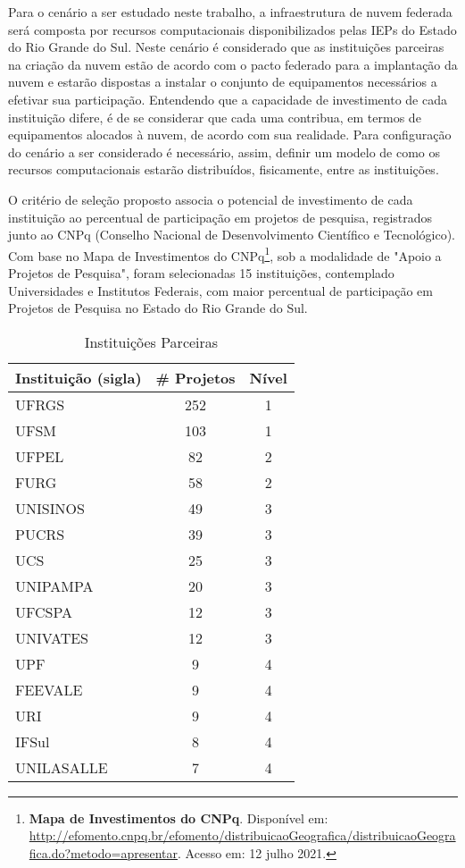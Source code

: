 \documentclass[tese,capa]{texufpel}
\begin{document}
Para o cenário a ser estudado neste trabalho, a infraestrutura de nuvem federada será composta por recursos computacionais disponibilizados pelas IEPs do Estado do Rio Grande do Sul. Neste cenário é considerado que as instituições parceiras na criação da nuvem estão de acordo com o pacto federado para a implantação da nuvem e estarão dispostas a instalar o conjunto de equipamentos necessários a efetivar sua participação. Entendendo que a capacidade de investimento de cada instituição difere, é de se considerar que cada uma contribua, em termos de equipamentos alocados à nuvem, de acordo com sua realidade. Para configuração do cenário a ser considerado é necessário, assim, definir um modelo de como os recursos computacionais estarão distribuídos, fisicamente, entre as instituições. 

O critério de seleção proposto associa o potencial de investimento de cada instituição ao percentual de participação em projetos de pesquisa, registrados junto ao CNPq (Conselho Nacional de Desenvolvimento Científico e Tecnológico). Com base no Mapa de Investimentos do CNPq\footnote{\textbf{Mapa de Investimentos do CNPq}. Disponível em: \url{http://efomento.cnpq.br/efomento/distribuicaoGeografica/distribuicaoGeografica.do?metodo=apresentar}. Acesso em: 12 julho 2021.}, sob a modalidade de "Apoio a Projetos de Pesquisa", foram selecionadas 15 instituições, contemplado Universidades e Institutos Federais, com maior percentual de participação em Projetos de Pesquisa no Estado do Rio Grande do Sul.

\begin{table}[H]
\centering
\caption{Instituições Parceiras}
\label{tab:instpar}
\begin{tabular}{@{}lcc@{}}
\toprule
\textbf{Instituição (sigla)} & \multicolumn{1}{l}{\textbf{\# Projetos}} & \multicolumn{1}{l}{\textbf{Nível}} \\ \midrule
UFRGS      & 252 & 1 \\
UFSM       & 103 & 1 \\ \midrule
UFPEL      & 82  & 2 \\
FURG       & 58  & 2 \\ \midrule
UNISINOS   & 49  & 3 \\
PUCRS      & 39  & 3 \\
UCS        & 25  & 3 \\
UNIPAMPA   & 20  & 3 \\
UFCSPA     & 12  & 3 \\
UNIVATES   & 12  & 3 \\ \midrule
UPF        & 9   & 4 \\ 
FEEVALE    & 9   & 4 \\
URI        & 9   & 4 \\
IFSul      & 8   & 4 \\
UNILASALLE & 7   & 4 \\ \bottomrule
\end{tabular}
\end{table}
\end{document}
